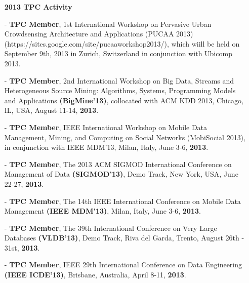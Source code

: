 \documentclass[10pt]{article}
\begin{document}
\begin{itemize}
\begin{itemize}
%
\vspace{0.1in}
\item[]{\bf 2013 TPC Activity\hrulefill }
%
\item[-] {\bf TPC Member},
1st International Workshop on Pervasive Urban Crowdsensing Architecture and Applications (PUCAA 2013) (https://sites.google.com/site/pucaaworkshop2013/), which wiill be held on September 9th, 2013 in Zurich, Switzerland in conjunction with Ubicomp 2013.
\item[-] {\bf TPC Member}, 2nd International Workshop on Big Data, Streams and Heterogeneous Source Mining: Algorithms, Systems, Programming Models and Applications {\bf (BigMine'13)}, collocated with ACM KDD 2013, Chicago, IL, USA, August 11-14, {\bf 2013}.
\item[-] {\bf TPC Member}, IEEE International Workshop on Mobile Data Management, Mining, and Computing on Social Networks (MobiSocial 2013), in conjunction with IEEE MDM'13, Milan, Italy, June 3-6, {\bf 2013}.
\item[-] {\bf TPC Member}, The 2013 ACM SIGMOD International Conference on Management of Data {\bf (SIGMOD'13)}, Demo Track, New York, USA, June 22-27, {\bf 2013}.
\item[-] {\bf TPC Member}, The 14th IEEE International Conference on Mobile Data Management {\bf (IEEE MDM'13)},
Milan, Italy, June 3-6, {\bf 2013}.
\item[-] {\bf TPC Member}, The 39th International Conference on Very Large Databases {\bf (VLDB'13)}, Demo Track, Riva del Garda, Trento, August 26th - 31st, {\bf 2013}.
\item[-] {\bf TPC Member}, IEEE 29th International Conference on Data Engineering {\bf (IEEE ICDE'13)}, Brisbane, Australia, April 8-11, {\bf 2013}.


\end{itemize}
\end{itemize}
\end{document}

